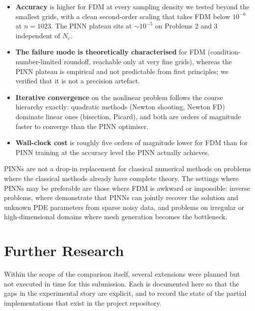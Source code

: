 \documentclass[11pt]{article}
\theoremstyle{plain}
\theoremstyle{remark}
\begin{document}
\begin{itemize}
\item \textbf{Accuracy} is higher for FDM at every sampling density we
      tested beyond the smallest grids, with a clean second-order scaling
      that takes FDM below $10^{-6}$ at $n = 1023$. The PINN plateau
      sits at $\sim\!10^{-5}$ on Problems 2 and 3 independent of $N_c$.
\item \textbf{The failure mode is theoretically characterised} for FDM
      (condition-number-limited roundoff, reachable only at very fine
      grids), whereas the PINN plateau is empirical and not
      predictable from first principles; we verified that it is not a
      precision artefact.
\item \textbf{Iterative convergence} on the nonlinear problem follows
      the course hierarchy exactly: quadratic methods (Newton shooting,
      Newton FD) dominate linear ones (bisection, Picard), and both are
      orders of magnitude faster to converge than the PINN optimiser.
\item \textbf{Wall-clock cost} is roughly five orders of magnitude lower
      for FDM than for PINN training at the accuracy level the PINN
      actually achieves.
\end{itemize}

PINNs are not a drop-in replacement for classical numerical methods on
problems where the classical methods already have complete theory. The
settings where PINNs may be preferable are those where FDM is awkward
or impossible: inverse problems, where \citet{raissi2019} demonstrate
that PINNs can jointly recover the solution and unknown PDE parameters
from sparse noisy data, and problems on irregular or high-dimensional
domains where mesh generation becomes the bottleneck.


\section{Further Research}
\label{sec:further}

Within the scope of the comparison itself, several extensions were
planned but not executed in time for this submission. Each is documented
here so that the gaps in the experimental story are explicit, and to
record the state of the partial implementations that exist in the
project repository.
\end{document}
